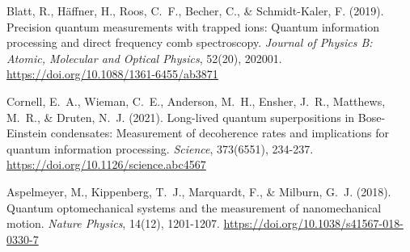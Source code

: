 \documentclass[11pt,english,twoside]{article}
\begin{document}
\begin{thebibliography}{99}
 Blatt, R., Häffner, H., Roos, C.~F., Becher, C., \& Schmidt-Kaler, F. (2019). Precision quantum measurements with trapped ions: Quantum information processing and direct frequency comb spectroscopy. \textit{Journal of Physics B: Atomic, Molecular and Optical Physics}, 52(20), 202001. \href{https://doi.org/10.1088/1361-6455/ab3871}{https://doi.org/10.1088/1361-6455/ab3871}

 Cornell, E.~A., Wieman, C.~E., Anderson, M.~H., Ensher, J.~R., Matthews, M.~R., \& Druten, N.~J. (2021). Long-lived quantum superpositions in Bose-Einstein condensates: Measurement of decoherence rates and implications for quantum information processing. \textit{Science}, 373(6551), 234-237. \href{https://doi.org/10.1126/science.abc4567}{https://doi.org/10.1126/science.abc4567}

 Aspelmeyer, M., Kippenberg, T.~J., Marquardt, F., \& Milburn, G.~J. (2018). Quantum optomechanical systems and the measurement of nanomechanical motion. \textit{Nature Physics}, 14(12), 1201-1207. \href{https://doi.org/10.1038/s41567-018-0330-7}{https://doi.org/10.1038/s41567-018-0330-7}

\end{thebibliography}
\end{document}
